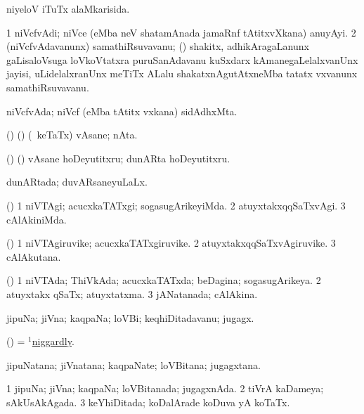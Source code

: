 \bentry
{}
\gl{\gu}
\bmng
niyeloV iTuTx alaMkarisida. 
\emng
\eentry

\bentry
{}
\gl{\nA}
\bmng
\bnum
\num{1} niVcfvAdi; niVce (eMba neV shatamAnada jamaRnf tAtitxvXkana) anuyAyi. 
\num{2} (niVcfvAdavanunx) samathiRsuvavanu; (\kanmu) shakitx, adhikAragaLanunx gaLisaloVsuga loVkoVtatxra puruSanAdavanu kuSxdarx kAmanegaLelalxvanUnx jayisi, uLidelalxranUnx meTiTx ALalu shakatxnAgutAtxneMba tatatx vxvanunx samathiRsuvavanu. 
\enum
\emng
\eentry

\bentry
{}
\gl{\nA}
\bmng
niVcfvAda; niVcf (eMba tAtitx vxkana) sidAdhxMta. 
\emng
\eentry

\bentry
{}
\gl{\nA}
\bmng
(\birx) (\AmA) (\kanmu\ keTaTx) vAsane; nAta. 
\emng
\eentry

\bentry
{}
\gl{\nA}
\bmng
(\birx) (\AmA) vAsane hoDeyutitxru; dunARta hoDeyutitxru. 
\emng
\eentry

\bentry
{}
\gl{\gu}
\bmng
dunARtada; duvARsaneyuLaLx. 
\emng
\eentry

\bentry
{}
\gl{\kirxvi}
\bmng
(\AmA) 
\bnum
\num{1} niVTAgi; acucxkaTATxgi; sogasugArikeyiMda. 
\num{2} atuyxtakxqqSaTxvAgi. 
\num{3} cAlAkiniMda. 
\enum
\emng
\eentry

\bentry
{}
\gl{\nA}
\bmng
(\AmA) 
\bnum
\num{1} niVTAgiruvike; acucxkaTATxgiruvike. 
\num{2} atuyxtakxqqSaTxvAgiruvike. 
\num{3} cAlAkutana. 
\enum
\emng
\eentry

\bentry
{}
\gl{\gu}
\bmng
(\AmA) 
\bnum
\num{1} niVTAda; ThiVkAda; acucxkaTATxda; beDagina; sogasugArikeya. 
\num{2} atuyxtakx qSaTx; atuyxtatxma. 
\num{3} jANatanada; cAlAkina. 
\enum
\emng
\eentry

\bentry
{}
\gl{\nA}
\bmng
jipuNa; jiVna; kaqpaNa; loVBi; keqhiDitadavanu; jugagx. 
\emng
\eentry

\bentry
{}
\gl{\gu}
\bmng
(\pArxparx) = \hyperlink{niggardly(1)}{$^1$niggardly}. 
\emng
\eentry

\bentry
{}
\gl{\nA}
\bmng
jipuNatana; jiVnatana; kaqpaNate; loVBitana; jugagxtana. 
\emng
\eentry

\bentry
{}
\gl{\gu}
\bmng
\bnum
\num{1} jipuNa; jiVna; kaqpaNa; loVBitanada; jugagxnAda. 
\num{2} tiVrA kaDameya; sAkUsAkAgada. 
\num{3} keYhiDitada; koDalArade koDuva yA koTaTx. 
\enum
\emng
\eentry

